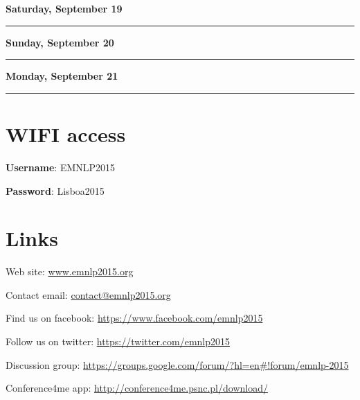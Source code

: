 \noindent \textbf{Saturday, September 19}

\vspace{-1.7ex}


\noindent \rule{1\columnwidth}{1pt}

\vspace{-4ex}




\noindent \textbf{Sunday, September 20}

\vspace{-1.7ex}


\noindent \rule{1\columnwidth}{1pt}

\vspace{-4ex}




\noindent \textbf{Monday, September 21}

\vspace{-1.7ex}


\noindent \rule{1\columnwidth}{1pt}

\vspace{-4ex}




\normalsize

\clearpage{}



\section*{WIFI access}

\textbf{Username}: EMNLP2015

\textbf{Password}: Lisboa2015


\section*{Links}

Web site: \url{www.emnlp2015.org}

Contact email: \url{contact@emnlp2015.org}

Find us on facebook: \url{https://www.facebook.com/emnlp2015}

Follow us on twitter: \url{https://twitter.com/emnlp2015}

Discussion group: \url{https://groups.google.com/forum/?hl=en#!forum/emnlp-2015}

Conference4me app: \url{http://conference4me.psnc.pl/download/}

\clearpage{}\thispagestyle{empty}
